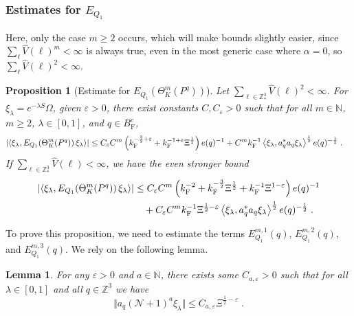 \documentclass[12pt,a4paper]{article}
\numberwithin{equation}{section}
\newcommand{\cN}{\mathcal{N}}
\newcommand{\NNN}{\mathbb{N}}
\newcommand{\1}{\mathbb{I}}
\newcommand{\F}{\mathrm{F}}
\newcommand{\N}{\mathbb{N}}
\newcommand{\Z}{\mathbb{Z}}
\newcommand{\half}{\frac{1}{2}}
\newcommand{\eva}[1]{\left\langle #1 \right\rangle}
\theoremstyle{plain}
\newtheorem{lemma}[theorem]{Lemma}
\newtheorem{proposition}[theorem]{Proposition}
\theoremstyle{definition}
\theoremstyle{remark}
\theoremstyle{plain}
\theoremstyle{definition}
\theoremstyle{remark}
\begin{document}
\subsubsection{Estimates for $E_{Q_1}$}

Here, only the case $ m \ge 2 $ occurs, which will make bounds slightly easier, since $ \sum_\ell \hat{V}(\ell)^m < \infty $ is always true, even in the most generic case where $ \alpha = 0 $, so $ \sum_\ell \hat{V}(\ell)^2 < \infty $.

\begin{proposition}[Estimate for $E_{Q_1}(\Theta^m_{K}(P^q))$]\label{prop:finEQ1est}
Let $ \sum_{\ell \in \Z^3_*} \hat{V}(\ell)^2 < \infty $. For $\xi_\lambda = e^{-\lambda S} \Omega$, given $ \varepsilon > 0 $, there exist constants $ C, C_\varepsilon > 0 $ such that for all $ m \in \NNN $, $ m \ge 2 $, $ \lambda \in [0,1] $, and $ q \in B_{\F}^c $,
\begin{align} \label{eq:finalEQ1est_Coulomb}
	\abs{\eva{\xi_\lambda, E_{Q_1}\!\left(\Theta^m_K(P^q)\right) \xi_\lambda}}
	&\leq C_\varepsilon C^m \left( k_{\F}^{-\frac 32 + \varepsilon}
		+ k_{\F}^{-1 + \varepsilon} \Xi^\half \right)
		e(q)^{-1}
		+ C^m k_{\F}^{-1} \eva{\xi_\lambda, a_q^* a_q \xi_\lambda}^{\half} e(q)^{-\half} \;.
\end{align}
If $ \sum_{\ell \in \Z^3_*} \hat{V}(\ell) < \infty $, we have the even stronger bound
\begin{align} \label{eq:finalEQ1est}
	\abs{\eva{\xi_\lambda, E_{Q_1}\!\left(\Theta^m_K(P^q)\right) \xi_\lambda}}
	&\leq C_\varepsilon C^m \left(
		k_{\F}^{-2}
		+ k_{\F}^{-\frac{3}{2}} \Xi^\half
		+ k_{\F}^{-1}\Xi^{1-\varepsilon} \right) e(q)^{-1} \nonumber\\
	&\quad + C_\varepsilon C^m k_{\F}^{-1} \Xi^{\half - \varepsilon} \eva{\xi_\lambda, a_q^* a_q \xi_\lambda}^{\half} e(q)^{-\half} \;.
\end{align}
\end{proposition}

To prove this proposition, we need to estimate the terms $ E^{m,1}_{Q_1}(q) $, $ E^{m,2}_{Q_1}(q) $, and $ E^{m,3}_{Q_1}(q) $. We rely on the following lemma.

\begin{lemma} \label{lem:Xi_halfminusepsilon}
For any $ \varepsilon > 0 $ and $ a \in \N $, there exists some $ C_{a,\varepsilon} > 0 $ such that for all $ \lambda \in [0,1] $ and all $ q \in \Z^3 $ we have
\begin{equation} \label{eq:Xi_halfminusepsilon}
	\Vert a_q (\cN + 1)^a \xi_\lambda \Vert
	\le C_{a,\varepsilon} \Xi^{\half-\varepsilon} \;.
\end{equation}
\end{lemma}
\end{document}
